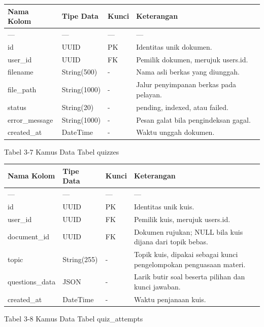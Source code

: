 \documentclass[12pt,a4paper]{article}
\begin{document}
\begin{table}[h]
\centering
\begin{tabular}{llll}
\toprule
Nama Kolom & Tipe Data & Kunci & Keterangan \\
\midrule
--- & --- & --- & --- \\
id & UUID & PK & Identitas unik dokumen. \\
user\_id & UUID & FK & Pemilik dokumen, merujuk users.id. \\
filename & String(500) & - & Nama asli berkas yang diunggah. \\
file\_path & String(1000) & - & Jalur penyimpanan berkas pada pelayan. \\
status & String(20) & - & pending, indexed, atau failed. \\
error\_message & String(1000) & - & Pesan galat bila pengindeksan gagal. \\
created\_at & DateTime & - & Waktu unggah dokumen. \\
\bottomrule
\end{tabular}
\end{table}
Tabel 3-7	Kamus Data Tabel quizzes

\begin{table}[h]
\centering
\begin{tabular}{llll}
\toprule
Nama Kolom & Tipe Data & Kunci & Keterangan \\
\midrule
--- & --- & --- & --- \\
id & UUID & PK & Identitas unik kuis. \\
user\_id & UUID & FK & Pemilik kuis, merujuk users.id. \\
document\_id & UUID & FK & Dokumen rujukan; NULL bila kuis dijana dari topik bebas. \\
topic & String(255) & - & Topik kuis, dipakai sebagai kunci pengelompokan penguasaan materi. \\
questions\_data & JSON & - & Larik butir soal beserta pilihan dan kunci jawaban. \\
created\_at & DateTime & - & Waktu penjanaan kuis. \\
\bottomrule
\end{tabular}
\end{table}
Tabel 3-8	Kamus Data Tabel quiz\_attempts
\end{document}
